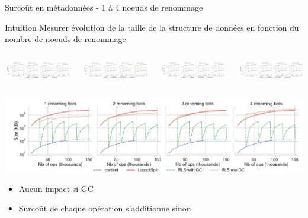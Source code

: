 \begin{frame}{Surcoût en métadonnées - 1 à 4 noeuds de renommage}
  \begin{block}{Intuition}
    Mesurer évolution de la taille de la structure de données \alert{en fonction du nombre de noeuds de renommage}
  \end{block}
  \begin{columns}
    \begin{column}{0.25\textwidth}
      \includegraphics[width=1.15\columnwidth,trim=1.6cm 0.8cm 35.8cm 0cm, clip]{img/2022-12-07-snapshot-sizes-1-4-rb.pdf}
    \end{column}
    \begin{column}{0.25\textwidth}
      \includegraphics<2->[width=\columnwidth,trim=15cm 0.8cm 24cm 0cm, clip]{img/2022-12-07-snapshot-sizes-1-4-rb.pdf}
    \end{column}
    \begin{column}{0.25\textwidth}
      \includegraphics<3->[width=\columnwidth,trim=27cm 0.8cm 12cm 0cm, clip]{img/2022-12-07-snapshot-sizes-1-4-rb.pdf}
    \end{column}
    \begin{column}{0.25\textwidth}
      \includegraphics<4->[width=\columnwidth,trim=39cm 0.8cm 0cm 0cm, clip]{img/2022-12-07-snapshot-sizes-1-4-rb.pdf}
    \end{column}
  \end{columns}
  \vspace{-1em}
  \begin{center}
    \includegraphics[width=\columnwidth,trim=2cm 0cm 2cm 12cm, clip]{img/2022-12-07-snapshot-sizes-1-4-rb.pdf}
  \end{center}
  \begin{itemize}
    \item<5> Aucun impact si GC
    \item<5> Surcoût de chaque opération \ren s'additionne sinon
  \end{itemize}
\end{frame}

